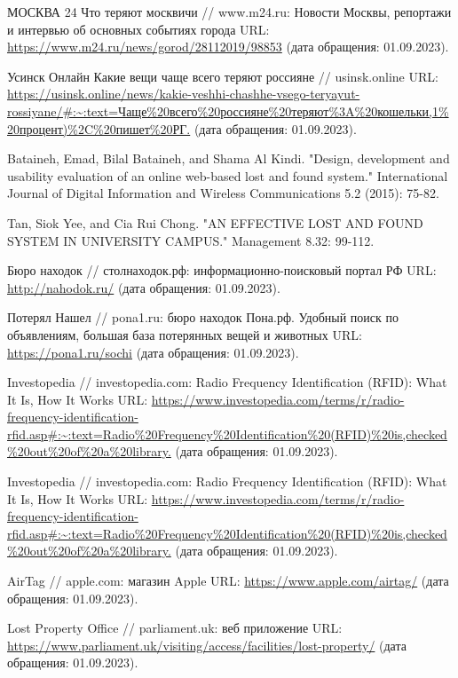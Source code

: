\documentclass{mirea-article}
\begin{document}
	\begin{thebibliography}{99\kern\bibindent}
		 МОСКВА 24 Что теряют москвичи // www.m24.ru: Новости Москвы, репортажи и интервью об основных событиях города URL: \url{https://www.m24.ru/news/gorod/28112019/98853} (дата обращения: 01.09.2023).
		
		 Усинск Онлайн Какие вещи чаще всего теряют россияне // usinsk.online URL: \url{https://usinsk.online/news/kakie-veshhi-chashhe-vsego-teryayut-rossiyane/#:~:text=Чаще%20всего%20россияне%20теряют%3A%20кошельки,1%20процент)%2C%20пишет%20РГ.} (дата обращения: 01.09.2023).
		
		 Bataineh, Emad, Bilal Bataineh, and Shama Al Kindi. "Design, development and usability evaluation of an online web-based lost and found system." International Journal of Digital Information and Wireless Communications 5.2 (2015): 75-82. %
		
		 Tan, Siok Yee, and Cia Rui Chong. "AN EFFECTIVE LOST AND FOUND SYSTEM IN UNIVERSITY CAMPUS." Management 8.32: 99-112. %
		
		
		 Бюро находок // столнаходок.рф: информационно-поисковый портал РФ URL: \url{http://nahodok.ru/} (дата обращения: 01.09.2023).
		
		 Потерял Нашел // pona1.ru: бюро находок Пона.рф. Удобный поиск по объявлениям, большая база потерянных вещей и животных URL: \url{https://pona1.ru/sochi} (дата обращения: 01.09.2023).
		
		 Investopedia // investopedia.com: Radio Frequency Identification (RFID): What It Is, How It Works URL: \url{https://www.investopedia.com/terms/r/radio-frequency-identification-rfid.asp#:~:text=Radio%20Frequency%20Identification%20(RFID)%20is,checked%20out%20of%20a%20library.} (дата обращения: 01.09.2023).
		
		 Investopedia // investopedia.com: Radio Frequency Identification (RFID): What It Is, How It Works URL: \url{https://www.investopedia.com/terms/r/radio-frequency-identification-rfid.asp#:~:text=Radio%20Frequency%20Identification%20(RFID)%20is,checked%20out%20of%20a%20library.} (дата обращения: 01.09.2023).
		
		 AirTag // apple.com: магазин Apple URL: \url{https://www.apple.com/airtag/} (дата обращения: 01.09.2023).
		
		 Lost Property Office // parliament.uk: веб приложение URL: \url{https://www.parliament.uk/visiting/access/facilities/lost-property/} (дата обращения: 01.09.2023).
	\end{thebibliography}
	
\end{document}

